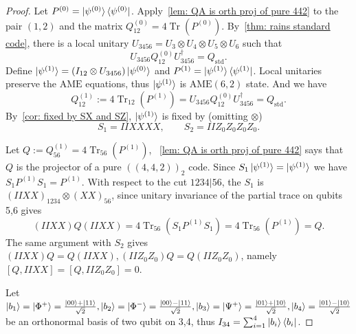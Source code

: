\begin{proof}
    Let $P^{(0)}=\ket{\psi^{(0)}}\bra{\psi^{(0)}}$. Apply~\cref{lem: QA is orth proj of pure 442} to the pair $(1,2)$ and the matrix $Q_{12}^{(0)}=4\operatorname{Tr}(P^{(0)})$. By~\cref{thm: rains standard code}, there is a local unitary $U_{3456}=U_3\otimes U_4\otimes U_5\otimes U_6$ such that 
    \begin{equation}
        U_{3456}Q_{12}^{(0)}U_{3456}^\dagger=Q_{\mathrm{std}}.
    \end{equation}
    Define $\ket{\psi^{(1)}}=(I_{12}\otimes U_{3456})\ket{\psi^{(0)}}$ and $P^{(1)}=\ket{\psi^{(1)}}\bra{\psi^{(1)}}$. Local unitaries preserve the $\mathrm{AME}$ equations, thus $\ket{\psi^{(1)}}$ is $\mathrm{AME}(6,2)$ state. And we have 
    \begin{equation}
        Q_{12}^{(1)}:=4\operatorname{Tr}_{12}(P^{(1)})=U_{3456}Q_{12}^{(0)}U_{3456}^\dagger=Q_{\mathrm{std}}.
    \end{equation}
    By~\cref{cor: fixed by SX and SZ}, $\ket{\psi^{(1)}}$ is fixed by (omitting $\otimes$) 
    \begin{equation}
        S_1=IIXXXX,\quad\quad S_2=IIZ_0Z_0Z_0Z_0.
    \end{equation}

    Let $Q:=Q_{56}^{(1)}=4\operatorname{Tr}_{56}(P^{(1)})$, ~\cref{lem: QA is orth proj of pure 442} says that $Q$ is the projector of a pure $((4,4,2))_2$ code. Since $S_1\ket{\psi^{(1)}}=\ket{\psi^{(1)}}$ we have $S_1P^{(1)}S_1=P^{(1)}$. With respect to the cut $1234|56$, the $S_1$ is $(IIXX)_{1234}\otimes (XX)_{56}$, since unitary invariance of the partial trace on qubits 5,6 gives
    \begin{equation}
        (IIXX)Q(IIXX)=4\operatorname{Tr}_{56}(S_1P^{(1)}S_1)=4\operatorname{Tr}_{56}(P^{(1)})=Q.
    \end{equation}
    The same argument with $S_2$ gives $(IIXX)Q=Q(IIXX),(IIZ_0Z_0)Q=Q(IIZ_0Z_0)$, namely $[Q,IIXX]=[Q,IIZ_0Z_0]=0$.

    Let $\ket{b_1}=\ket{\Phi^+}=\frac{\ket{00}+\ket{11}}{\sqrt 2},\ket{b_2}=\ket{\Phi^-}=\frac{\ket{00}-\ket{11}}{\sqrt 2},\ket{b_3}=\ket{\Psi^+}=\frac{\ket{01}+\ket{10}}{\sqrt 2},\ket{b_4}=\frac{\ket{01}-\ket{10}}{\sqrt 2}$ be an orthonormal basis of two qubit on 3,4, thus $I_{34}=\sum_{i=1}^4\ket{b_i}\bra{b_i}$.


\end{proof}
